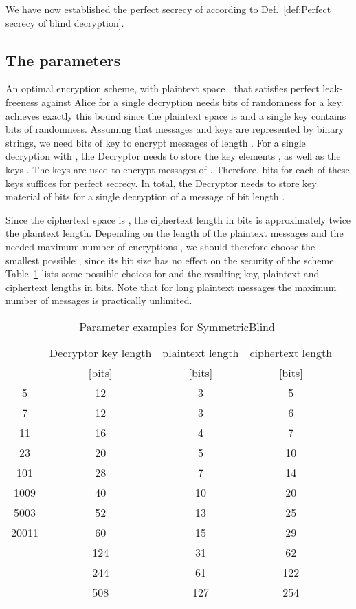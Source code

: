 \documentclass[10pt,journal]{IEEEtran}
\begin{document}
We have now established the perfect secrecy of 
 according to Def.~\ref{def:Perfect secrecy of blind decryption}.

\subsection{The parameters}

An optimal encryption scheme, with plaintext space ,
that satisfies perfect leak-freeness against Alice for a single decryption
needs
 bits of randomness for a key.
 achieves exactly this bound
since the plaintext space is  and
a single key  contains  bits of randomness.
Assuming that messages and keys are represented by binary strings, we
need  bits of key
to encrypt messages of length .
For a single decryption with , the Decryptor needs to store the key elements , as well as
the keys .
The keys  are used to encrypt messages of . Therefore, 
 bits for each of these keys suffices for perfect secrecy.
In total, the Decryptor needs to store
key material of  bits
for a single decryption of a message of bit length .

Since the ciphertext space is ,
the ciphertext length in bits is approximately twice the plaintext length.
Depending on the length of the plaintext messages and the needed maximum number of encryptions , we should therefore
choose the smallest possible , since its bit size has no effect on the security of the scheme. Table~\ref{tab:Various parameter examples}
lists some possible choices for  and the resulting key, plaintext and ciphertext lengths in bits. Note that
for long plaintext messages the maximum number of messages  is practically unlimited.
\begin{table}\caption{Parameter examples for SymmetricBlind}
\begin{tabular}{ccccc}
 & Decryptor key length & plaintext length & ciphertext length\\
& [bits] & [bits] & [bits]\\
\hline
5 & 12 & 3 & 5\\
7 & 12 & 3 & 6\\
11 & 16 & 4 & 7\\
23 & 20 & 5 & 10\\
101 & 28 & 7 & 14\\
1009 & 40 & 10 & 20\\
5003 & 52 & 13 & 25\\
20011 & 60 & 15 & 29\\
 & 124 & 31 & 62\\
 & 244 & 61 & 122\\
 & 508 & 127 & 254\\
\end{tabular}
\vspace{4pt}
\label{tab:Various parameter examples}
\end{table}
\end{document}
